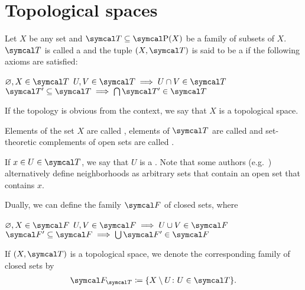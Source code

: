 \section{Topological spaces}\label{sec:topological_spaces}

\begin{definition}\label{def:topological_space}\cite[11]{Engelking1989}
  Let $X$ be any set and $\Cal{T} \subseteq \Power(X)$ be a family of subsets of $X$. $\Cal{T}$ is called a  and the tuple $(X, \Cal{T})$ is said to be a  if the following axioms are satisfied:
  \begin{description}
     $\varnothing, X \in \Cal{T}$
     $U, V \in \Cal{T} \implies U \cap V \in \Cal{T}$
     $\Cal{T}' \subseteq \Cal{T} \implies \bigcap \Cal{T}' \in \Cal{T}$
  \end{description}

  If the topology is obvious from the context, we say that $X$ is a topological space.

  Elements of the set $X$ are called , elements of $\Cal{T}$ are called  and set-theoretic complements of open sets are called .

  If $x \in U \in \Cal{T}$, we say that $U$ is a . Note that some authors (e.g.~\cite[38]{Kelley1955}) alternatively define neighborhoods as arbitrary sets that contain an open set that contains $x$.

  Dually, we can define the family $\Cal{F}$ of closed sets, where
  \begin{description}
     $\varnothing, X \in \Cal{F}$
     $U, V \in \Cal{F} \implies U \cup V \in \Cal{F}$
     $\Cal{F}' \subseteq \Cal{F} \implies \bigcup \Cal{F}' \in \Cal{F}$
  \end{description}

  If $(X, \Cal{T})$ is a topological space, we denote the corresponding family of closed sets by
  \begin{align*}
    \Cal{F}_{\Cal{T}} \coloneqq \{ X \setminus U \colon U \in \Cal{T} \}.
  \end{align*}
\end{definition}

